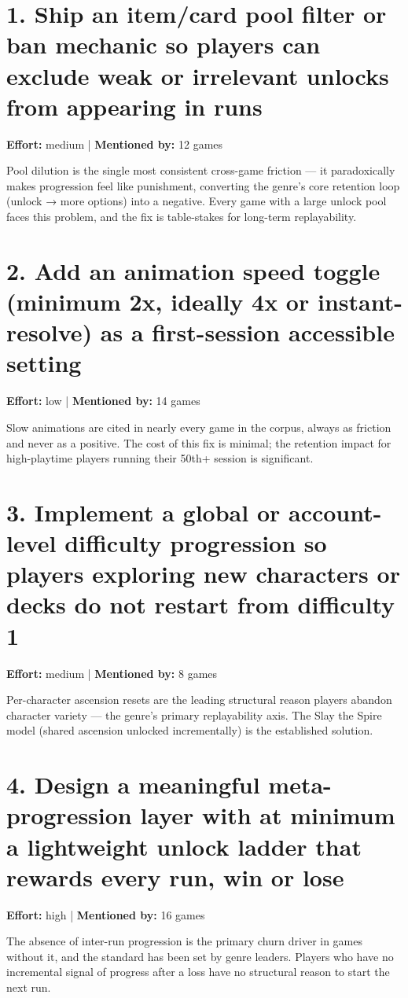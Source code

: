 \documentclass[11pt,letterpaper]{report}
\begin{document}
\section*{1. Ship an item/card pool filter or ban mechanic so players can exclude weak or irrelevant unlocks from appearing in runs}
\label{sec:org911436a}
\textbf{Effort:} medium | \textbf{Mentioned by:} 12 games

Pool dilution is the single most consistent cross-game friction — it paradoxically makes progression feel like punishment, converting the genre's core retention loop (unlock → more options) into a negative. Every game with a large unlock pool faces this problem, and the fix is table-stakes for long-term replayability.
\section*{2. Add an animation speed toggle (minimum 2x, ideally 4x or instant-resolve) as a first-session accessible setting}
\label{sec:org3f56490}
\textbf{Effort:} low | \textbf{Mentioned by:} 14 games

Slow animations are cited in nearly every game in the corpus, always as friction and never as a positive. The cost of this fix is minimal; the retention impact for high-playtime players running their 50th+ session is significant.
\section*{3. Implement a global or account-level difficulty progression so players exploring new characters or decks do not restart from difficulty 1}
\label{sec:org32b1fd2}
\textbf{Effort:} medium | \textbf{Mentioned by:} 8 games

Per-character ascension resets are the leading structural reason players abandon character variety — the genre's primary replayability axis. The Slay the Spire model (shared ascension unlocked incrementally) is the established solution.
\section*{4. Design a meaningful meta-progression layer with at minimum a lightweight unlock ladder that rewards every run, win or lose}
\label{sec:org5b0574f}
\textbf{Effort:} high | \textbf{Mentioned by:} 16 games

The absence of inter-run progression is the primary churn driver in games without it, and the standard has been set by genre leaders. Players who have no incremental signal of progress after a loss have no structural reason to start the next run.
\end{document}
